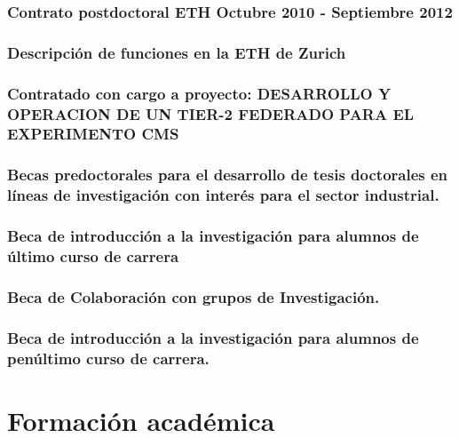 \documentclass[a4paper, 11pt, twoside, openright]{report}
\begin{document}
\subsection{Contrato postdoctoral ETH Octubre 2010 - Septiembre 2012}

\subsection{Descripción de funciones en la ETH de Zurich}

\subsection{Contratado con cargo a proyecto: DESARROLLO Y OPERACION DE UN TIER-2 FEDERADO PARA EL EXPERIMENTO CMS}

\subsection{Becas predoctorales para el desarrollo de tesis doctorales en líneas de investigación con interés para el sector industrial.}

\subsection{Beca de introducción a la investigación para alumnos de último curso de carrera}

\subsection{Beca de Colaboración con grupos de Investigación.}

\subsection{Beca de introducción a la investigación para alumnos de penúltimo curso de carrera.}


\chapter{Formación académica}
\end{document}
